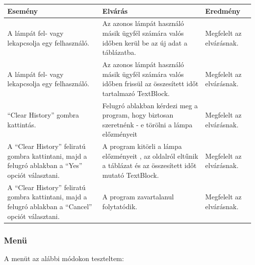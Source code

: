 \documentclass[a4paper,12pt]{report}
\begin{document}
\begin{center}
    \begin{tabular}{ | m{4.5cm} | m{4.5cm} | m{4.5cm} |}
        \hline
        Esemény & Elvárás & Eredmény \\ \hline
        A lámpát fel- vagy lekapcsolja egy felhasználó. & Az azonos lámpát használó másik ügyfél számára valós időben kerül be az új adat
        a táblázatba. & Megfelelt az elvárásnak. \\ \hline
        A lámpát fel- vagy lekapcsolja egy felhasználó. & Az azonos lámpát használó másik ügyfél számára valós időben frissül az összesített
        időt tartalmazó TextBlock. & Megfelelt az elvárásnak. \\ \hline
        ``Clear History'' gombra kattintás. & Felugró ablakban kérdezi meg a program, hogy biztosan szeretnénk - e törölni a lámpa előzményeit
        & Megfelelt az elvárásnak.\\ \hline
        A ``Clear History'' feliratú gombra kattintani, majd a felugró ablakban a ``Yes'' opciót választani. & A program kitörli a lámpa előzményeit
        , az oldalról eltűnik a táblázat és az összesített időt mutató TextBlock. & Megfelelt az elvárásnak.\\ \hline
        A ``Clear History'' feliratú gombra kattintani, majd a felugró ablakban a ``Cancel'' opciót választani. & A program zavartalanul folytatódik. &
        Megfelelt az elvárásnak. \\ \hline
        \hline
    \end{tabular}
\end{center}

\subsubsection{Menü}
    A menüt az alábbi módokon teszteltem:
\end{document}
